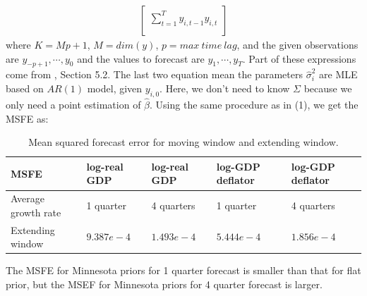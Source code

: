 \documentclass[11pt, oneside]{article}   	%
\begin{document}
\begin{enumerate}[(1)]
\begin{align}
\begin{bmatrix}
\sum_{t=1}^{T} y _{i,t-1} y _{i,t}\\
\end{bmatrix}
\end{align}
where $K = Mp + 1$, $M = dim(y)$, $p = max~time~lag$, and the given observations are $y _{-p+1},\cdots,y _{0}$ and the values to forecast are $y_1,\cdots,y_T$. Part of these expressions come from \cite{hamilton1994time}, Section 5.2. The last two equation mean the parameters $\hat { \sigma}_i^2$ are MLE based on $AR(1)$ model, given $y _{i,0}$.
Here, we don't need to know $ \Sigma$ because we only need a point estimation of $\hat { \beta}$. Using the same procedure as in (1), we get the MSFE as:
\begin{table}[!ht]
\center
\captionsetup{width=0.8\textwidth}
\begin{tabularx}{0.8\textwidth}{|X|X|X|X|X|} \hline 
MSFE & log-real GDP & log-real GDP & log-GDP deflator & log-GDP deflator \\ \hline
 Average growth rate & 1 quarter & 4 quarters & 1 quarter & 4 quarters \\ \hline
 Extending window & $9.387e-4$ & $1.493e-4$ & $5.444e-4$ & $1.856e-4$ \\ \hline 
 \end{tabularx} 
\caption{Mean squared forecast error for moving window and extending window.}
\label{table:MSFE_minne_prior}
\end{table}
The MSFE for Minnesota priors for 1 quarter forecast is smaller than that for flat prior, but the MSEF for Minnesota priors for 4 quarter forecast is larger.


\end{enumerate}
\end{document}
